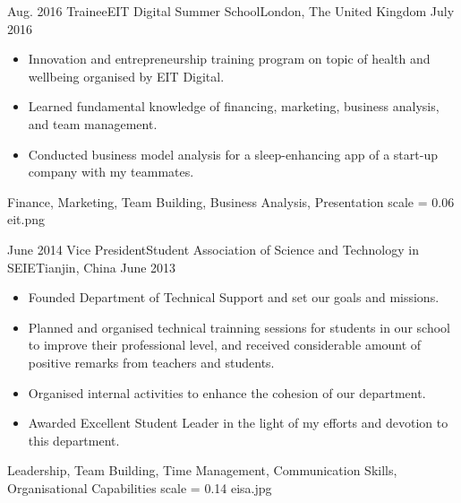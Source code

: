
\begin{experiences}
	\experience
	{Aug. 2016}	{Trainee}{EIT Digital Summer School}{London, The United Kingdom}
	{July 2016}	{
		\begin{itemize}
			\item Innovation and entrepreneurship training program on topic of health and wellbeing organised by EIT Digital.
			\item Learned fundamental knowledge of financing, marketing, business analysis, and team management.
			\item Conducted business model analysis for a sleep-enhancing app of a start-up company with my teammates.
		\end{itemize}
	}
	{Finance, Marketing, Team Building, Business Analysis, Presentation}
	{scale = 0.06}		{eit.png} 
	\emptySeparator
	
	\experience
	{June 2014}	{Vice President}{Student Association of Science and Technology in  SEIE}{Tianjin, China}
	{June 2013}	{
		\begin{itemize}
			\item Founded Department of Technical Support and set our goals and missions.
			\item Planned and organised technical trainning sessions for students in our school to improve their professional level, and received considerable amount of positive remarks from teachers and students.
			\item Organised internal activities to enhance the cohesion of our department.
			\item Awarded Excellent Student Leader in the light of my efforts and devotion to this department.
		\end{itemize}
	}
	{Leadership, Team Building, Time Management, Communication Skills, Organisational Capabilities}
	{scale = 0.14}		{eisa.jpg} 
\end{experiences}